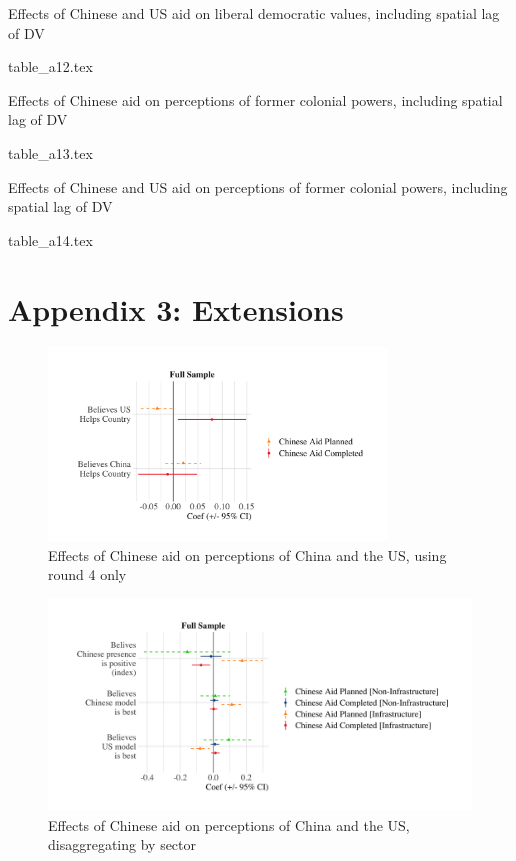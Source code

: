 \documentclass[9pt]{article}
\begin{document}
\setlength{\tabcolsep}{5pt}
\begin{table}[H]
\caption{Effects of Chinese and US aid on liberal democratic values, including spatial lag of DV}
\label{reg}
\centering
{table_a12.tex}
\end{table}

\newpage %

\setlength{\tabcolsep}{5pt}
\begin{table}[H]
\caption{Effects of Chinese aid on perceptions of former colonial powers, including spatial lag of DV}
\label{reg}
\centering
{table_a13.tex}
\end{table}

\setlength{\tabcolsep}{5pt}
\begin{table}[H]
\caption{Effects of Chinese and US aid on perceptions of former colonial powers, including spatial lag of DV}
\label{reg}
\centering
{table_a14.tex}
\end{table}

\newpage
\section{Appendix 3: Extensions}

\begin{figure}[H]
\centering
\includegraphics[width=0.8\textwidth]{figures/figure_a16.png}
\caption{Effects of Chinese aid on perceptions of China and the US, using round 4 only}
\end{figure}

\begin{figure}[H]
\centering
\includegraphics[width=1\textwidth]{figures/figure_a17.png}
\caption{Effects of Chinese aid on perceptions of China and the US, disaggregating by sector}
\end{figure}
\end{document}
